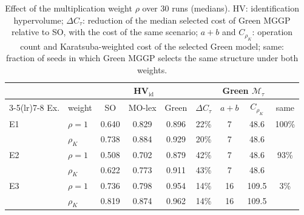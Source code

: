\begin{table}[t]
\centering
\caption{Effect of the multiplication weight $\rho$ over 30 runs (medians). HV: identification hypervolume; $\Delta C_\tau$: reduction of the median selected cost of Green MGGP relative to SO, with the cost of the same scenario; $a{+}b$ and $C_{\rho_K}$: operation count and Karatsuba-weighted cost of the selected Green model; same: fraction of seeds in which Green MGGP selects the same structure under both weights.}
\label{tab:rho}
\setlength{\tabcolsep}{3.5pt}
\small
\begin{tabular}{llccccccc}
\toprule
 & & \multicolumn{3}{c}{HV$_\mathrm{id}$} & & \multicolumn{2}{c}{Green $\mathcal M_\tau$} & \\
\cmidrule(lr){3-5}\cmidrule(lr){7-8}
Ex. & weight & SO & MO-lex & Green & $\Delta C_\tau$ & $a{+}b$ & $C_{\rho_K}$ & same \\
\midrule
E1 & $\rho=1$ & 0.640 & 0.829 & 0.896 & 22\% & 7 & 48.6 & 100\% \\
 & $\rho_K$ & 0.738 & 0.884 & 0.929 & 20\% & 7 & 48.6 &  \\
\midrule
E2 & $\rho=1$ & 0.508 & 0.702 & 0.879 & 42\% & 7 & 48.6 & 93\% \\
 & $\rho_K$ & 0.622 & 0.773 & 0.911 & 43\% & 7 & 48.6 &  \\
\midrule
E3 & $\rho=1$ & 0.736 & 0.798 & 0.954 & 14\% & 16 & 109.5 & 3\% \\
 & $\rho_K$ & 0.819 & 0.874 & 0.962 & 14\% & 16 & 109.5 &  \\
\bottomrule
\end{tabular}
\end{table}

